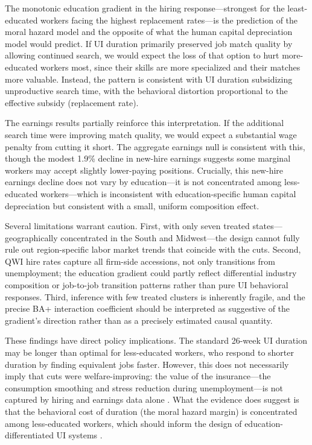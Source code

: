 \documentclass[12pt]{article}
\begin{document}
The monotonic education gradient in the hiring response---strongest for the least-educated workers facing the highest replacement rates---is the prediction of the moral hazard model and the opposite of what the human capital depreciation model would predict. If UI duration primarily preserved job match quality by allowing continued search, we would expect the loss of that option to hurt more-educated workers most, since their skills are more specialized and their matches more valuable. Instead, the pattern is consistent with UI duration subsidizing unproductive search time, with the behavioral distortion proportional to the effective subsidy (replacement rate).

The earnings results partially reinforce this interpretation. If the additional search time were improving match quality, we would expect a substantial wage penalty from cutting it short. The aggregate earnings null is consistent with this, though the modest 1.9\% decline in new-hire earnings suggests some marginal workers may accept slightly lower-paying positions. Crucially, this new-hire earnings decline does not vary by education---it is not concentrated among less-educated workers---which is inconsistent with education-specific human capital depreciation but consistent with a small, uniform composition effect.

Several limitations warrant caution. First, with only seven treated states---geographically concentrated in the South and Midwest---the design cannot fully rule out region-specific labor market trends that coincide with the cuts. Second, QWI hire rates capture all firm-side accessions, not only transitions from unemployment; the education gradient could partly reflect differential industry composition or job-to-job transition patterns rather than pure UI behavioral responses. Third, inference with few treated clusters is inherently fragile, and the precise BA+ interaction coefficient should be interpreted as suggestive of the gradient's direction rather than as a precisely estimated causal quantity.

These findings have direct policy implications. The standard 26-week UI duration may be longer than optimal for less-educated workers, who respond to shorter duration by finding equivalent jobs faster. However, this does not necessarily imply that cuts were welfare-improving: the value of the insurance---the consumption smoothing and stress reduction during unemployment---is not captured by hiring and earnings data alone \citep{chetty2008moral, ganong2019consumer, kolsrud2018optimal}. What the evidence does suggest is that the behavioral cost of duration (the moral hazard margin) is concentrated among less-educated workers, which should inform the design of education-differentiated UI systems \citep{le2019optimal}.
\end{document}
